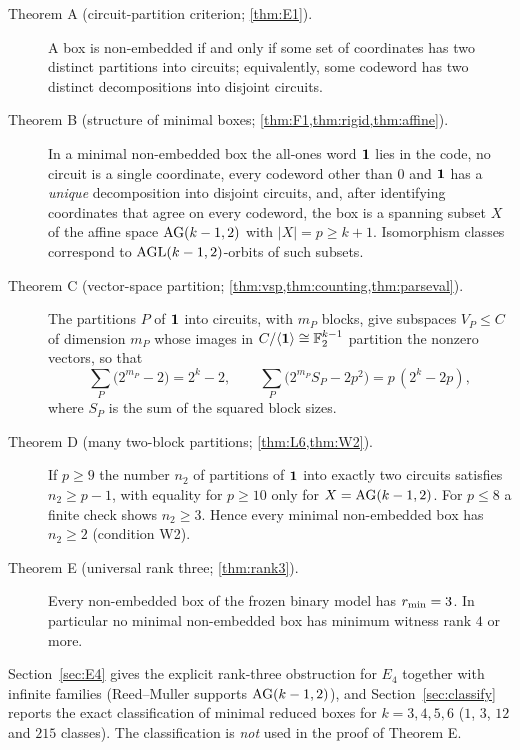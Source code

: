 \begin{description}
\item[Theorem A (circuit-partition criterion; \cref{thm:E1}).] A box is non-embedded if and only if some set of coordinates has two distinct partitions into circuits; equivalently, some codeword has two distinct decompositions into disjoint circuits.

\item[Theorem B (structure of minimal boxes; \cref{thm:F1,thm:rigid,thm:affine}).] In a minimal non-embedded box the all-ones word $\mathbf 1$ lies in the code, no circuit is a single coordinate, every codeword other than $0$ and $\mathbf 1$ has a \emph{unique} decomposition into disjoint circuits, and, after identifying coordinates that agree on every codeword, the box is a spanning subset $X$ of the affine space $\mathrm{AG}(k-1,2)$ with $|X|=p\ge k+1$. Isomorphism classes correspond to $\mathrm{AGL}(k-1,2)$-orbits of such subsets.

\item[Theorem C (vector-space partition; \cref{thm:vsp,thm:counting,thm:parseval}).] The partitions $P$ of $\mathbf 1$ into circuits, with $m_P$ blocks, give subspaces $V_P\le C$ of dimension $m_P$ whose images in $C/\langle\mathbf 1\rangle\cong\mathbb F_2^{k-1}$ partition the nonzero vectors, so that
\[
\sum_P\bigl(2^{m_P}-2\bigr)=2^k-2,\qquad
\sum_P\bigl(2^{m_P}S_P-2p^2\bigr)=p\,(2^k-2p),
\]
where $S_P$ is the sum of the squared block sizes.

\item[Theorem D (many two-block partitions; \cref{thm:L6,thm:W2}).] If $p\ge9$ the number $n_2$ of partitions of $\mathbf 1$ into exactly two circuits satisfies $n_2\ge p-1$, with equality for $p\ge10$ only for $X=\mathrm{AG}(k-1,2)$. For $p\le 8$ a finite check shows $n_2\ge3$. Hence every minimal non-embedded box has $n_2\ge2$ (condition W2).

\item[Theorem E (universal rank three; \cref{thm:rank3}).] Every non-embedded box of the frozen binary model has $r_{\min}=3$. In particular no minimal non-embedded box has minimum witness rank $4$ or more.
\end{description}

Section~\ref{sec:E4} gives the explicit rank-three obstruction for $E_4$ together with infinite families (Reed--Muller supports $\mathrm{AG}(k-1,2)$), and Section~\ref{sec:classify} reports the exact classification of minimal reduced boxes for $k=3,4,5,6$ ($1$, $3$, $12$ and $215$ classes). The classification is \emph{not} used in the proof of Theorem E.

